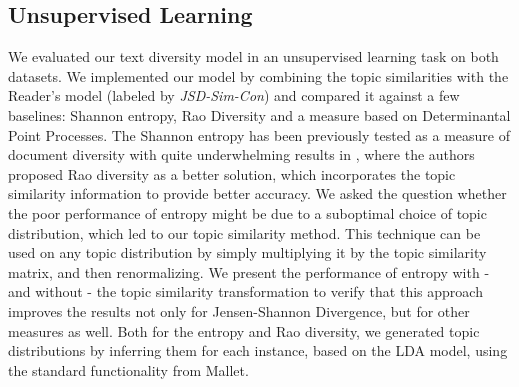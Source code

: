 \subsection{Unsupervised Learning}
\label{sec:unsupervised-learning}

We evaluated our text diversity model in an unsupervised learning task
on both datasets.
We implemented our model by combining the topic similarities with the
Reader's model (labeled by {\em JSD-Sim-Con}) and compared it against a few
baselines: Shannon entropy, Rao Diversity and a measure
based on Determinantal Point Processes.
The Shannon entropy has
been previously tested as a measure of document diversity with quite
underwhelming results in \cite{bache:2013}, where the authors proposed 
Rao diversity as a better solution, which incorporates the topic similarity
information to provide better accuracy. We asked the question whether
the poor performance of entropy might be due to a suboptimal choice of
topic distribution, which led to our topic similarity
method. This technique can be used on any topic distribution
by simply multiplying it by the topic similarity matrix, and then
renormalizing. We present the performance of entropy with - and
without - the topic
similarity transformation to verify that this approach improves the results not
only for Jensen-Shannon Divergence, but for other measures as well.
Both for the entropy and Rao diversity, we generated topic
distributions by inferring them for each instance, based on the LDA
model, using the standard functionality from Mallet.

